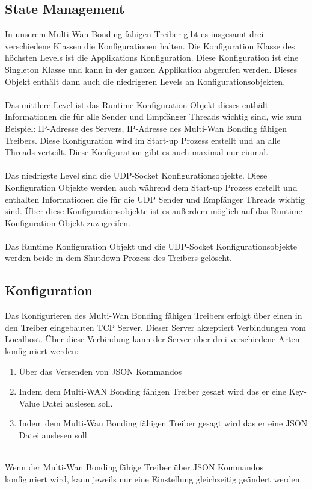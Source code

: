 \subsection{State Management}
In unserem Multi-Wan Bonding fähigen Treiber gibt es insgesamt drei verschiedene Klassen die Konfigurationen halten. Die Konfiguration Klasse des höchsten Levels ist die Applikations Konfiguration. Diese Konfiguration ist eine Singleton Klasse und kann in der ganzen Applikation abgerufen werden. Dieses Objekt enthält dann auch die niedrigeren Levels an Konfigurationsobjekten.
\\\\
Das mittlere Level ist das Runtime Konfiguration Objekt dieses enthält Informationen die für alle Sender und Empfänger Threads wichtig sind, wie zum Beispiel: IP-Adresse des Servers, IP-Adresse des Multi-Wan Bonding fähigen Treibers. Diese Konfiguration wird im Start-up Prozess erstellt und an alle Threads verteilt. Diese Konfiguration gibt es auch maximal nur einmal.
\\\\
Das niedrigste Level sind die UDP-Socket Konfigurationsobjekte. Diese Konfiguration Objekte werden auch während dem Start-up Prozess erstellt und enthalten Informationen die für die UDP Sender und Empfänger Threads wichtig sind. Über diese Konfigurationsobjekte ist es außerdem möglich auf das Runtime Konfiguration Objekt zuzugreifen. 
\\\\
Das Runtime Konfiguration Objekt und die UDP-Socket Konfigurationsobjekte werden beide in dem Shutdown Prozess des Treibers gelöscht.
\subsection{Konfiguration}
Das Konfigurieren des Multi-Wan Bonding fähigen Treibers erfolgt über einen in den Treiber eingebauten TCP Server. Dieser Server akzeptiert Verbindungen vom Localhost. Über diese Verbindung kann der Server über drei verschiedene Arten konfiguriert werden:
\\
\begin{enumerate}
    \item Über das Versenden von JSON Kommandos
    \item Indem dem Multi-WAN Bonding fähigen Treiber gesagt wird das er eine Key-Value Datei auslesen soll.
    \item Indem dem Multi-Wan Bonding fähigen Treiber gesagt wird das er eine JSON Datei auslesen soll.
\end{enumerate}
\ \\
Wenn der Multi-Wan Bonding fähige Treiber über JSON Kommandos konfiguriert wird, kann jeweils nur eine Einstellung gleichzeitig geändert werden.

